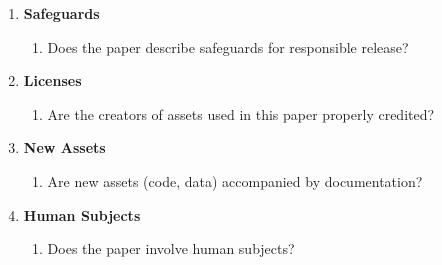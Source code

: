 \documentclass{article}
\begin{document}
\begin{enumerate}
\item {\bf Safeguards}
    \begin{enumerate}
        \item Does the paper describe safeguards for responsible release?
    \end{enumerate}

\item {\bf Licenses}
    \begin{enumerate}
        \item Are the creators of assets used in this paper properly credited?
    \end{enumerate}

\item {\bf New Assets}
    \begin{enumerate}
        \item Are new assets (code, data) accompanied by documentation?
    \end{enumerate}

\item {\bf Human Subjects}
    \begin{enumerate}
        \item Does the paper involve human subjects?
        \answerNo{}
    \end{enumerate}

\end{enumerate}
\end{document}
